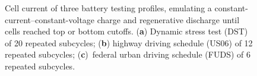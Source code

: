 \begin{figure}[H]
    \caption{Cell current of three battery testing profiles, emulating a constant-current--constant-voltage charge and regenerative discharge until cells reached top or bottom cutoffs. (\textbf{a}) Dynamic stress test (DST) of 20 repeated subcycles; (\textbf{b}) highway driving schedule (US06) of 12 repeated subcycles; (\textbf{c})~federal urban driving schedule (FUDS) of 6 repeated subcycles.}
    \label{fig:current-profs}
\end{figure}
